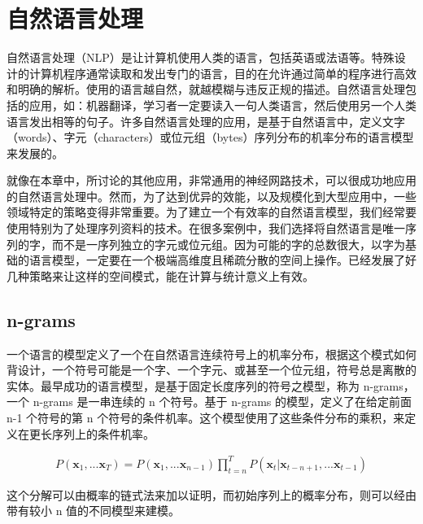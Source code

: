 
\section{自然语言处理}


自然语言处理（NLP）是让计算机使用人类的语言，包括英语或法语等。特殊设计的计算机程序通常读取和发出专门的语言，目的在允许通过简单的程序进行高效和明确的解析。使用的语言越自然，就越模糊与违反正规的描述。自然语言处理包括的应用，如：机器翻译，学习者一定要读入一句人类语言，然后使用另一个人类语言发出相等的句子。许多自然语言处理的应用，是基于自然语言中，定义文字（words）、字元（characters）或位元组（bytes）序列分布的机率分布的语言模型来发展的。


就像在本章中，所讨论的其他应用，非常通用的神经网路技术，可以很成功地应用的自然语言处理中。然而，为了达到优异的效能，以及规模化到大型应用中，一些领域特定的策略变得非常重要。为了建立一个有效率的自然语言模型，我们经常要使用特别为了处理序列资料的技术。在很多案例中，我们选择将自然语言是唯一序列的字，而不是一序列独立的字元或位元组。因为可能的字的总数很大，以字为基础的语言模型，一定要在一个极端高维度且稀疏分散的空间上操作。已经发展了好几种策略来让这样的空间模式，能在计算与统计意义上有效。


\subsection{n-grams}

一个语言的模型定义了一个在自然语言连续符号上的机率分布，根据这个模式如何背设计，一个符号可能是一个字、一个字元、或甚至一个位元组，符号总是离散的实体。最早成功的语言模型，是基于固定长度序列的符号之模型，称为 n-grams，一个 n-grams 是一串连续的 n 个符号。基于 n-grams 的模型，定义了在给定前面 n-1 个符号的第 n 个符号的条件机率。这个模型使用了这些条件分布的乘积，来定义在更长序列上的条件机率。

\begin{align}
\label{eq:necessary}
P(\bm{x}_{1},...\bm{x}_{T}) 
 = P(\bm{x}_{1},...\bm{x}_{n-1}) \prod_{t=n}^{T}P(\bm{x}_{t} | \bm{x}_{t-n+1},...\bm{x}_{t-1}) 
\end{align}


这个分解可以由概率的链式法来加以证明，而初始序列上的概率分布，则可以经由带有较小 n 值的不同模型来建模。


